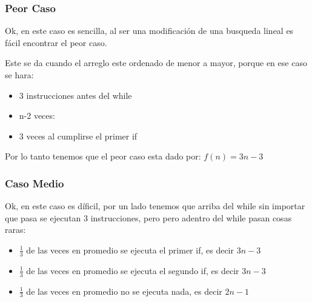 \documentclass[12pt, fleqn]{article}                            %
\theoremstyle{break}                                            %
\begin{document}
        \clearpage
        \subsubsection{Peor Caso}

            Ok, en este caso es sencilla, al ser una modificación de una busqueda lineal
            es fácil encontrar el peor caso.

            Este se da cuando el arreglo este ordenado de menor a mayor, porque en ese caso
            se hara:
            \begin{itemize}
                \item 3 instrucciones antes del while
                \item n-2 veces:
                    \item 3 veces al cumplirse el primer if
            \end{itemize}

            Por lo tanto tenemos que el peor caso esta dado por:
            $f(n) = 3n - 3$


        \vspace{1em}
        \subsubsection{Caso Medio}

            Ok, en este caso es díficil, por un lado tenemos que arriba del while
            sin importar que pasa se ejecutan 3 instrucciones, pero pero adentro del
            while pasan cosas raras:
            \begin{itemize}
                \item $\frac{1}{3}$ de las veces en promedio se ejecuta el primer if, es 
                    decir $3n - 3$
                \item $\frac{1}{3}$ de las veces en promedio se ejecuta el segundo if, es 
                    decir $3n - 3$
                \item $\frac{1}{3}$ de las veces en promedio no se ejecuta nada, es 
                    decir $2n - 1$
            \end{itemize}
\end{document}

